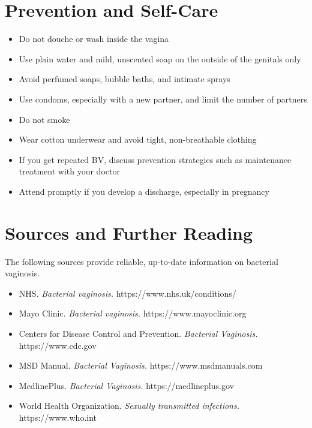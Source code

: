 \section*{Prevention and Self-Care}
\begin{itemize}
    \item Do not douche or wash inside the vagina
    \item Use plain water and mild, unscented soap on the outside of the genitals only
    \item Avoid perfumed soaps, bubble baths, and intimate sprays
    \item Use condoms, especially with a new partner, and limit the number of partners
    \item Do not smoke
    \item Wear cotton underwear and avoid tight, non-breathable clothing
    \item If you get repeated BV, discuss prevention strategies such as maintenance treatment with your doctor
    \item Attend promptly if you develop a discharge, especially in pregnancy
\end{itemize}

\section*{Sources and Further Reading}
The following sources provide reliable, up-to-date information on bacterial vaginosis.
\begin{itemize}
    \item NHS. \textit{Bacterial vaginosis.} https://www.nhs.uk/conditions/
    \item Mayo Clinic. \textit{Bacterial vaginosis.} https://www.mayoclinic.org
    \item Centers for Disease Control and Prevention. \textit{Bacterial Vaginosis.} https://www.cdc.gov
    \item MSD Manual. \textit{Bacterial Vaginosis.} https://www.msdmanuals.com
    \item MedlinePlus. \textit{Bacterial Vaginosis.} https://medlineplus.gov
    \item World Health Organization. \textit{Sexually transmitted infections.} https://www.who.int
\end{itemize}
